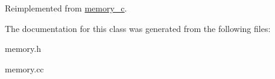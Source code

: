 Reimplemented from \hyperlink{classmemory__c_aa15a04b3d5bb8e6ab0b7274b9c50a319}{memory\_\-c}.



The documentation for this class was generated from the following files:\begin{DoxyCompactItemize}
\item 
memory.h\item 
memory.cc\end{DoxyCompactItemize}
